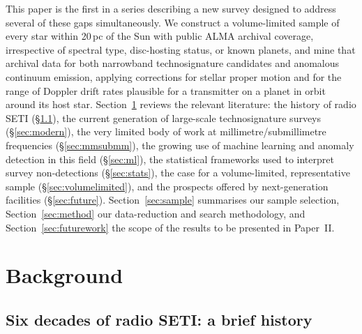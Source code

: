 \documentclass{openjournal}
\begin{document}
This paper is the first in a series describing a new survey designed to address
several of these gaps simultaneously. We construct a volume-limited sample of
every star within 20\,pc of the Sun with public ALMA archival coverage,
irrespective of spectral type, disc-hosting status, or known planets, and mine
that archival data for both narrowband technosignature candidates and anomalous
continuum emission, applying corrections for stellar proper motion and for the
range of Doppler drift rates plausible for a transmitter on a planet in orbit
around its host star. Section~\ref{sec:background} reviews the relevant
literature: the history of radio SETI (\S\ref{sec:history}), the current
generation of large-scale technosignature surveys (\S\ref{sec:modern}), the very
limited body of work at millimetre/submillimetre frequencies
(\S\ref{sec:mmsubmm}), the growing use of machine learning and anomaly detection
in this field (\S\ref{sec:ml}), the statistical frameworks used to interpret
survey non-detections (\S\ref{sec:stats}), the case for a volume-limited,
representative sample (\S\ref{sec:volumelimited}), and the prospects offered by
next-generation facilities (\S\ref{sec:future}). Section~\ref{sec:sample}
summarises our sample selection, Section~\ref{sec:method} our data-reduction and
search methodology, and Section~\ref{sec:futurework} the scope of the results to
be presented in Paper~II.

\section{Background}
\label{sec:background}

\subsection{Six decades of radio SETI: a brief history}
\label{sec:history}
\end{document}
